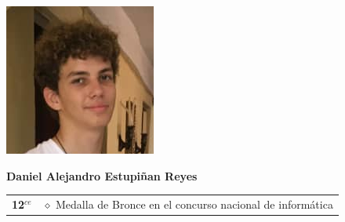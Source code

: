 \begin{minipage}{0.2\textwidth}
	\includegraphics[width=\linewidth]{img/concursantes/daniel.png} %
\end{minipage}
\hfill
\begin{minipage}{0.7\textwidth}
	\textbf{Daniel Alejandro Estupiñan Reyes}
	
	\vspace*{0.1in}
	\begin{tabular}{rl}
		
		
		\textbf{12$^{ce}$} &  $\diamond$ Medalla de Bronce en el concurso nacional de informática \\
		
		
	\end{tabular}
\end{minipage}

\vspace*{0.2in}


